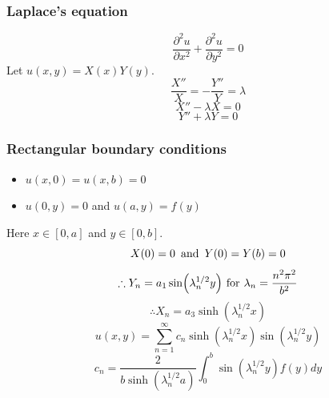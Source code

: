 \documentclass{article}
\begin{document}
\begin{multicols}{3}
\subsubsection*{Laplace's equation}
$$\frac{\partial^2 u}{\partial x^2}+\frac{\partial^2 u}{\partial y^2}=0$$
Let $u(x,y)=X(x)Y(y)$.
$$\frac{X''}{X}=-\frac{Y''}{Y}=\lambda$$
$$X''-\lambda X=0$$
$$Y''+\lambda Y=0$$

\subsubsection*{Rectangular boundary conditions}
\begin{itemize}
    \item $u(x,0)=u(x,b)=0$

    \item $u(0,y)=0$ and $u(a,y)=f(y)$
\end{itemize}
Here $x\in[0,a]$ and $y\in[0,b]$.
$$X(0)=0\hspace{0.07in}\text{and}\hspace{0.07in}Y(0)=Y(b)=0$$
$$\therefore Y_n=a_1\sin(\lambda_n^{1/2} y)\hspace{0.05in}
\text{for}\hspace{0.05in}\lambda_n=\frac{n^2\pi^2}{b^2}$$
$$\therefore X_n=a_3\sinh(\lambda_n^{1/2} x)$$
$$u(x,y)=\sum_{n=1}^{\infty}c_n\sinh(\lambda_n^{1/2} x)
\sin(\lambda_n^{1/2} y)$$
$$c_n=\frac{2}{b\sinh(\lambda_n^{1/2} a)}
\int_{0}^{b}\sin(\lambda_n^{1/2} y)f(y)dy$$


\end{multicols}
\end{document}
